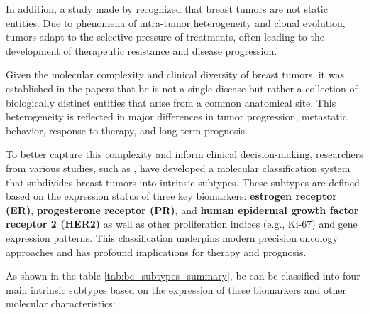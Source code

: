 In addition, a study made by \textcite{origins_and_evolution_bca_Polyak2007}
recognized that breast tumors are not static entities. Due to phenomena of
intra-tumor heterogeneity and clonal evolution, tumors adapt to the selective
pressure of treatments, often leading to the development of therapeutic
resistance and disease progression.

Given the molecular complexity and clinical diversity of breast tumors, it was
established in the papers
\textcite{clinical_implication_bca_Adamo2015,bc_subtypes_Prat2015Clinical} that
\gls{bc} is not a single disease but rather a collection of biologically
distinct entities that arise from a common anatomical site. This heterogeneity
is reflected in major differences in tumor progression, metastatic behavior,
response to therapy, and long-term prognosis.

To better capture this complexity and inform clinical decision-making,
researchers from various studies, such as
\textcite{bc_molecular_Perou2000,bc_subtypes_Prat2015Clinical}, have developed
a molecular classification system that subdivides breast tumors into intrinsic
subtypes. These subtypes are defined based on the expression status of three
key biomarkers: \textbf{estrogen receptor (ER)}, \textbf{progesterone receptor
  (PR)}, and \textbf{human epidermal growth factor receptor 2 (HER2)} as well as
other proliferation indices (e.g., Ki-67) and gene expression patterns. This
classification underpins modern precision oncology approaches and has profound
implications for therapy and prognosis.

As shown in the table \ref{tab:bc_subtypes_summary}, \gls{bc} can be classified
into four main intrinsic subtypes based on the expression of these biomarkers
and other molecular characteristics:

